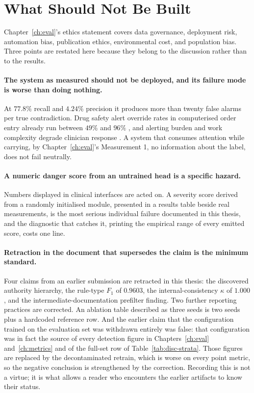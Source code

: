 \section{What Should Not Be Built}
\label{sec:disc-ethics}

Chapter~\ref{ch:eval}'s ethics statement covers data governance, deployment
risk, automation bias, publication ethics, environmental cost, and population
bias. Three points are restated here because they belong to the discussion
rather than to the results.

\paragraph{The system as measured should not be deployed, and its failure mode
is worse than doing nothing.} At $77.8\%$ recall and $4.24\%$ precision it
produces more than twenty false alarms per true contradiction. Drug safety alert
override rates in computerised order entry already run between $49\%$ and $96\%$
\citep{vandersijs2006overriding}, and alerting burden and work complexity
degrade clinician response \citep{ancker2017alertfatigue}. A system that consumes
attention while carrying, by Chapter~\ref{ch:eval}'s Measurement 1, no
information about the label, does not fail neutrally.

\paragraph{A numeric danger score from an untrained head is a specific hazard.}
Numbers displayed in clinical interfaces are acted on. A severity score derived
from a randomly initialised module, presented in a results table beside real
measurements, is the most serious individual failure documented in this thesis,
and the diagnostic that catches it, printing the empirical range of every
emitted score, costs one line.

\paragraph{Retraction in the document that supersedes the claim is the minimum
standard.} Four claims from an earlier submission are retracted in this thesis:
the discovered authority hierarchy, the rule-type $F_1$ of $0.9603$, the
internal-consistency $\kappa$ of $1.000$, and the intermediate-documentation
prefilter finding. Two further reporting practices are corrected. An ablation
table described as three seeds is two seeds plus a hardcoded reference row. And
the earlier claim that the configuration trained on the evaluation set was
withdrawn entirely was false: that configuration was in fact the source of every
detection figure in Chapters~\ref{ch:eval} and~\ref{ch:metrics} and of the
full-set row of Table~\ref{tab:disc-strata}. Those figures are replaced by the
decontaminated retrain, which is worse on every point metric, so the negative
conclusion is strengthened by the correction. Recording this is not a virtue; it
is what allows a reader who encounters the earlier artifacts to know their
status.


